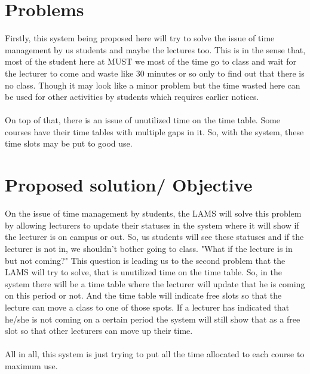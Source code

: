 \documentclass[a4paper,11]{article}
\begin{document}
\section{Problems}
Firstly, this system being proposed here will try to solve the issue of time management by us students and maybe the lectures too.
This is in the sense that, most of the student here at MUST we most of the time go to class and wait for the lecturer to come and waste like 30 minutes or so only to find out that there is no class. Though it may look like a minor problem but the time wasted here can be used for other activities by students which requires earlier notices. 
\\
\\
On top of that, there is an issue of unutilized time on the time table. Some courses have their time tables with multiple gaps in it. So, with the system, these time slots may be put to good use.


\section{Proposed solution/ Objective}
On the issue of time management by students, the LAMS will solve this problem by allowing lecturers to update their statuses in the system where it will show if the lecturer is on campus or out. So, us students will see these statuses and if the lecturer is not in, we shouldn't bother going to class. 
"What if the lecture is in but not coming?"
This question is leading us to the second problem that the LAMS will try to solve, that is unutilized time on the time table. So, in the system there will be a time table where the lecturer will update that he is coming on this period or not. And the time table will indicate free slots so that the lecture can move a class to one of those spots.
If a lecturer has indicated that he/she is not coming on a certain period the system will still show that as a free slot so that other lecturers can move up their time.
\\
\\
All in all, this system is just trying to put all the time allocated to each course to maximum use.


\pagebreak
\end{document}
